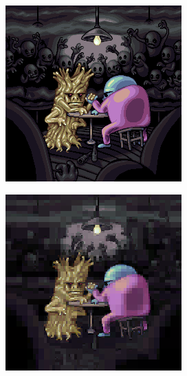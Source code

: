 \begin{figure}
	\centering
	\begin{subfigure}[t]{0.32\textwidth}
	\includegraphics[width=\linewidth]{plaatjes/bonkers.png}
	\end{subfigure}
	\begin{subfigure}[t]{0.32\textwidth}
	\includegraphics[width=\linewidth]{plaatjes/bonkers_haar_0_025.png}

\end{subfigure}
\end{figure}
